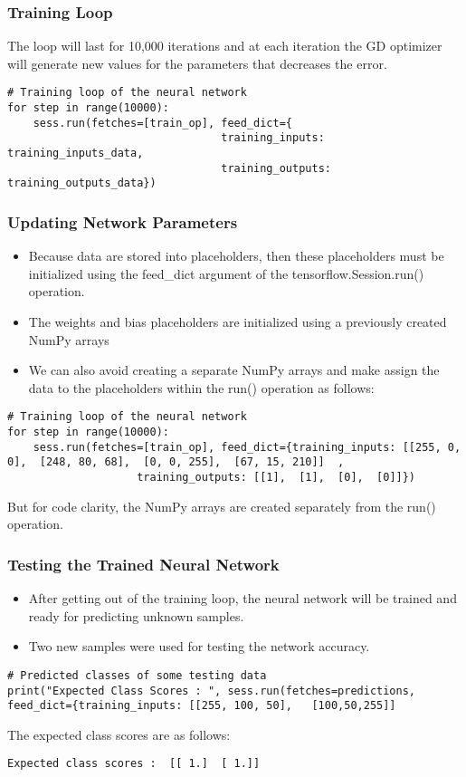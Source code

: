 \begin{frame}[fragile] \frametitle{Training Loop}
The loop will last for 10,000 iterations and at each iteration the GD optimizer will generate new values for the parameters that decreases the error.
\begin{lstlisting}
# Training loop of the neural network  
for step in range(10000):  
    sess.run(fetches=[train_op], feed_dict={
                                 training_inputs: training_inputs_data,  
                                 training_outputs: training_outputs_data}) 
\end{lstlisting}
\end{frame}

\begin{frame}[fragile] \frametitle{Updating Network Parameters}

\begin{itemize}
\item Because data are stored into placeholders, then these placeholders must be initialized using the feed\_dict argument of the tensorflow.Session.run() operation. 
\item The weights and bias placeholders are initialized using a previously created NumPy arrays 
\item We can also avoid creating a separate NumPy arrays and make assign the data to the placeholders within the run() operation as follows:
\end{itemize}
\begin{lstlisting}
# Training loop of the neural network  
for step in range(10000):  
    sess.run(fetches=[train_op], feed_dict={training_inputs: [[255, 0, 0],  [248, 80, 68],  [0, 0, 255],  [67, 15, 210]]  ,  
                    training_outputs: [[1],  [1],  [0],  [0]]})
\end{lstlisting}
But for code clarity, the NumPy arrays are created separately from the run() operation.
\end{frame}

\begin{frame}[fragile] \frametitle{Testing the Trained Neural Network}

\begin{itemize}
\item After getting out of the training loop, the neural network will be trained and ready for predicting unknown samples. 
\item Two new samples were used for testing the network accuracy.
\end{itemize}
\begin{lstlisting}
# Predicted classes of some testing data  
print("Expected Class Scores : ", sess.run(fetches=predictions, 
feed_dict={training_inputs: [[255, 100, 50],   [100,50,255]]   
\end{lstlisting}
The expected class scores are as follows:
\begin{lstlisting}
Expected class scores :  [[ 1.]  [ 1.]]   
\end{lstlisting}
\end{frame}


